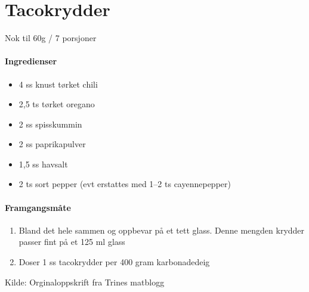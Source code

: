 \section{﻿Tacokrydder}
\label{tacokrydder}

Nok til 60g / 7 porsjoner
\paragraph{Ingredienser}
\begin{itemize}[noitemsep]
	\item 4 ss knust tørket chili
	\item 2,5 ts tørket oregano
	\item 2 ss spisskummin
	\item 2 ss paprikapulver
	\item 1,5 ss havsalt
	\item 2 ts sort pepper (evt erstattes med 1--2 ts cayennepepper)
\end{itemize}

\paragraph{Framgangsmåte}
\begin{enumerate}[noitemsep]
	\item Bland det hele sammen og oppbevar på et tett glass. Denne mengden krydder passer fint på et 125 ml glass
	\item Doser 1 ss tacokrydder per 400 gram karbonadedeig
\end{enumerate}

Kilde: Orginaloppskrift fra Trines matblogg

%


